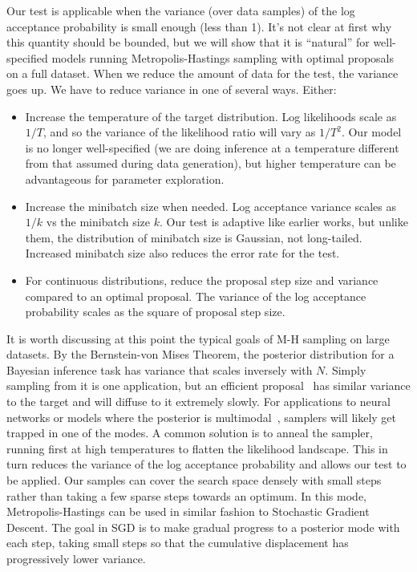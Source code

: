 \documentclass[twoside]{article} \usepackage{aistats2017}
\begin{document}
Our test is applicable when the variance (over data samples) of the log
acceptance probability is small enough (less than 1). It's not clear at first why
this quantity should be bounded, but we will show that it is ``natural'' for
well-specified models running Metropolis-Hastings sampling with optimal
proposals~\citep{OptimalScaling01} on a full dataset. When we reduce the amount
of data for the test, the variance goes up. We have to reduce variance in one
of several ways. Either:

\begin{itemize}[noitemsep]
    \item Increase the temperature of the target distribution. Log likelihoods
    scale as $1/T$, and so the variance of the likelihood ratio will vary as
    $1/T^2$. Our model is no longer well-specified (we are doing inference at a
    temperature different from that assumed during data generation), but higher
    temperature can be advantageous for parameter exploration.

    \item Increase the minibatch size when needed. Log acceptance variance
    scales as $1/k$ vs the minibatch size $k$. Our test is adaptive like earlier
    works, but unlike them, the distribution of minibatch size is Gaussian, not
    long-tailed.  Increased minibatch size also reduces the error rate for the
    test.

    \item For continuous distributions, reduce the proposal step size and
    variance compared to an optimal proposal. The variance of the log acceptance
    probability scales as the square of proposal step size. 
\end{itemize}

It is worth discussing at this point the typical goals of M-H sampling on large
datasets. By the Bernstein-von Mises Theorem, the posterior distribution for a
Bayesian inference task has variance that scales inversely with $N$. Simply
sampling from it is one application, but an efficient
proposal~\citep{OptimalScaling01} has similar variance to the target and will
diffuse to it extremely slowly. For applications to neural networks or models
where the posterior is multimodal~\citep{choromanska2014loss}, samplers will
likely get trapped in one of the modes. A common solution is to anneal the
sampler, running first at high temperatures to flatten the likelihood landscape.
This in turn reduces the variance of the log acceptance probability and allows
our test to be applied. Our samples can cover the search space densely with
small steps rather than taking a few sparse steps towards an optimum. In this
mode, Metropolis-Hastings can be used in similar fashion to Stochastic Gradient
Descent. The goal in SGD is to make gradual progress to a posterior mode with
each step, taking small steps so that the cumulative displacement has
progressively lower variance.
\end{document}
